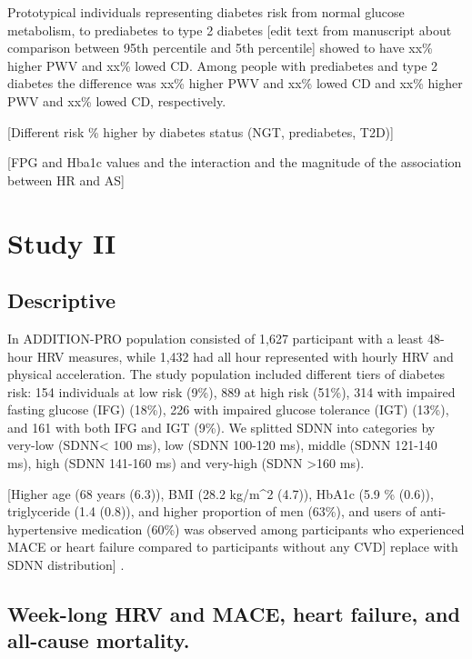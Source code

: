 \documentclass[
  a4paper,
  headsepline=true,
  open=any]{scrbook}
\begin{document}
Prototypical individuals representing diabetes risk from normal glucose
metabolism, to prediabetes to type 2 diabetes {[}edit text from
manuscript about comparison between 95th percentile and 5th
percentile{]} showed to have xx\% higher PWV and xx\% lowed CD. Among
people with prediabetes and type 2 diabetes the difference was xx\%
higher PWV and xx\% lowed CD and xx\% higher PWV and xx\% lowed CD,
respectively.

{[}Different risk \% higher by diabetes status (NGT, prediabetes,
T2D){]}

{[}FPG and Hba1c values and the interaction and the magnitude of the
association between HR and AS{]}


\hypertarget{study-ii}{%
\chapter{Study II}\label{study-ii}}

\hypertarget{descriptive-1}{%
\section{Descriptive}\label{descriptive-1}}

In ADDITION-PRO population consisted of 1,627 participant with a least
48-hour HRV measures, while 1,432 had all hour represented with hourly
HRV and physical acceleration. The study population included different
tiers of diabetes risk: 154 individuals at low risk (9\%), 889 at high
risk (51\%), 314 with impaired fasting glucose (IFG) (18\%), 226 with
impaired glucose tolerance (IGT) (13\%), and 161 with both IFG and IGT
(9\%). We splitted SDNN into categories by very-low (SDNN\textless{} 100
ms), low (SDNN 100-120 ms), middle (SDNN 121-140 ms), high (SDNN 141-160
ms) and very-high (SDNN \textgreater160 ms).

{[}Higher age (68 years (6.3)), BMI (28.2 kg/m\^{}2 (4.7)), HbA1c (5.9
\% (0.6)), triglyceride (1.4 (0.8)), and higher proportion of men
(63\%), and users of anti-hypertensive medication (60\%) was observed
among participants who experienced MACE or heart failure compared to
participants without any CVD{]} replace with SDNN distribution{]} .

\hypertarget{week-long-hrv-and-mace-heart-failure-and-all-cause-mortality.}{%
\section{Week-long HRV and MACE, heart failure, and all-cause
mortality.}\label{week-long-hrv-and-mace-heart-failure-and-all-cause-mortality.}}
\end{document}
